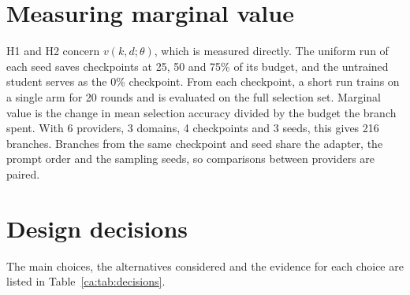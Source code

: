 \section{Measuring marginal value}
\label{ca:sec:branching}

H1 and H2 concern $v(k, d; \theta)$, which is measured directly. The uniform run of each
seed saves checkpoints at 25, 50 and 75\% of its budget, and the untrained student serves
as the 0\% checkpoint. From each checkpoint, a short run trains on a single arm for 20
rounds and is evaluated on the full selection set. Marginal value is the change in mean
selection accuracy divided by the budget the branch spent. With 6 providers, 3 domains,
4 checkpoints and 3 seeds, this gives 216 branches. Branches from the same checkpoint and
seed share the adapter, the prompt order and the sampling seeds, so comparisons between
providers are paired.

\section{Design decisions}
\label{ca:sec:decisions}

The main choices, the alternatives considered and the evidence for each choice are listed
in Table~\ref{ca:tab:decisions}.

